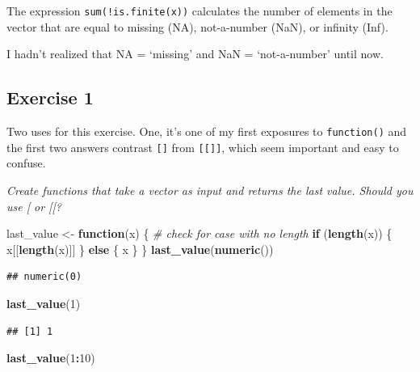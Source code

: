 \documentclass[
]{book}
\newenvironment{Shaded}{\begin{snugshade}}{\end{snugshade}}
\newcommand{\CommentTok}[1]{\textcolor[rgb]{0.56,0.35,0.01}{\textit{#1}}}
\newcommand{\ControlFlowTok}[1]{\textcolor[rgb]{0.13,0.29,0.53}{\textbf{#1}}}
\newcommand{\DecValTok}[1]{\textcolor[rgb]{0.00,0.00,0.81}{#1}}
\newcommand{\KeywordTok}[1]{\textcolor[rgb]{0.13,0.29,0.53}{\textbf{#1}}}
\newcommand{\NormalTok}[1]{#1}
\newcommand{\OperatorTok}[1]{\textcolor[rgb]{0.81,0.36,0.00}{\textbf{#1}}}
\newcommand{\StringTok}[1]{\textcolor[rgb]{0.31,0.60,0.02}{#1}}
\begin{document}
The expression \texttt{sum(!is.finite(x))} calculates the number of elements in the vector that are equal to missing (NA), not-a-number (NaN), or infinity (Inf).

I hadn't realized that NA = `missing' and NaN = `not-a-number' until now.

\hypertarget{exercise-1}{%
\subsection{Exercise 1}\label{exercise-1}}

Two uses for this exercise. One, it's one of my first exposures to \texttt{function()} and
the first two answers contrast \texttt{{[}{]}} from \texttt{{[}{[}{]}{]}}, which seem important and easy to
confuse.

\emph{Create functions that take a vector as input and returns the last value. Should you use {[} or {[}{[}?}

\begin{Shaded}
\begin{Highlighting}[]
\NormalTok{last_value <-}\StringTok{ }\ControlFlowTok{function}\NormalTok{(x) \{}
  \CommentTok{# check for case with no length}
  \ControlFlowTok{if}\NormalTok{ (}\KeywordTok{length}\NormalTok{(x)) \{}
\NormalTok{    x[[}\KeywordTok{length}\NormalTok{(x)]]}
\NormalTok{  \} }\ControlFlowTok{else}\NormalTok{ \{}
\NormalTok{    x}
\NormalTok{  \}}
\NormalTok{\}}
\KeywordTok{last_value}\NormalTok{(}\KeywordTok{numeric}\NormalTok{())}
\end{Highlighting}
\end{Shaded}

\begin{verbatim}
## numeric(0)
\end{verbatim}

\begin{Shaded}
\begin{Highlighting}[]
\KeywordTok{last_value}\NormalTok{(}\DecValTok{1}\NormalTok{)}
\end{Highlighting}
\end{Shaded}

\begin{verbatim}
## [1] 1
\end{verbatim}

\begin{Shaded}
\begin{Highlighting}[]
\KeywordTok{last_value}\NormalTok{(}\DecValTok{1}\OperatorTok{:}\DecValTok{10}\NormalTok{)}
\end{Highlighting}
\end{Shaded}
\end{document}

